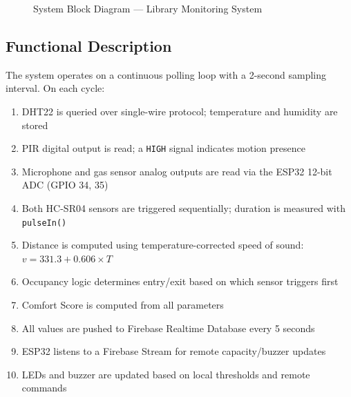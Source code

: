 \documentclass[12pt,a4paper]{article}
\begin{document}
\begin{figure}[H]
\caption{System Block Diagram — Library Monitoring System}
\end{figure}

\subsection{Functional Description}

The system operates on a continuous polling loop with a 2-second sampling interval. On each cycle:

\begin{enumerate}[leftmargin=1.5cm]
  \item DHT22 is queried over single-wire protocol; temperature and humidity are stored
  \item PIR digital output is read; a \texttt{HIGH} signal indicates motion presence
  \item Microphone and gas sensor analog outputs are read via the ESP32 12-bit ADC (GPIO 34, 35)
  \item Both HC-SR04 sensors are triggered sequentially; duration is measured with \texttt{pulseIn()}
  \item Distance is computed using temperature-corrected speed of sound: $v = 331.3 + 0.606 \times T$
  \item Occupancy logic determines entry/exit based on which sensor triggers first
  \item Comfort Score is computed from all parameters
  \item All values are pushed to Firebase Realtime Database every 5 seconds
  \item ESP32 listens to a Firebase Stream for remote capacity/buzzer updates
  \item LEDs and buzzer are updated based on local thresholds and remote commands
\end{enumerate}
\end{document}
